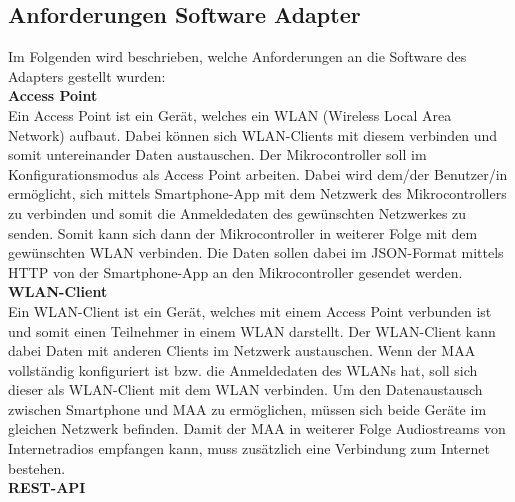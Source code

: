 \documentclass[11pt, twoside]{article}
\begin{document}
\subsection{Anforderungen Software Adapter}
Im Folgenden wird beschrieben, welche Anforderungen an die Software des Adapters gestellt wurden: \newline \\
\textbf{Access Point} \\
Ein Access Point ist ein Gerät, welches ein WLAN (Wireless Local Area Network) aufbaut. Dabei können sich WLAN-Clients mit diesem verbinden und somit untereinander Daten austauschen. \newline
\parencite[vgl.][]{noauthor_urlpi10_nodate-1} \newline
Der Mikrocontroller soll im Konfigurationsmodus als Access Point arbeiten. Dabei wird dem/der Benutzer/in ermöglicht, sich mittels Smartphone-App mit dem Netzwerk des Mikrocontrollers zu verbinden und somit die Anmeldedaten des gewünschten Netzwerkes zu senden. Somit kann sich dann der Mikrocontroller in weiterer Folge mit dem gewünschten WLAN verbinden. Die Daten sollen dabei im JSON-Format mittels HTTP von der Smartphone-App an den Mikrocontroller gesendet werden. \newline \\
\textbf{WLAN-Client} \\
Ein WLAN-Client ist ein Gerät, welches mit einem Access Point verbunden ist und somit einen Teilnehmer in einem WLAN darstellt. Der WLAN-Client kann dabei Daten mit anderen Clients im Netzwerk austauschen. Wenn der MAA vollständig konfiguriert ist bzw. die Anmeldedaten des WLANs hat, soll sich dieser als WLAN-Client mit dem WLAN verbinden. Um den Datenaustausch zwischen Smartphone und MAA zu ermöglichen, müssen sich beide Geräte im gleichen Netzwerk befinden. Damit der MAA in weiterer Folge Audiostreams von Internetradios empfangen kann, muss zusätzlich eine Verbindung zum Internet bestehen. \newline \\
\textbf{REST-API} \\
\end{document}
